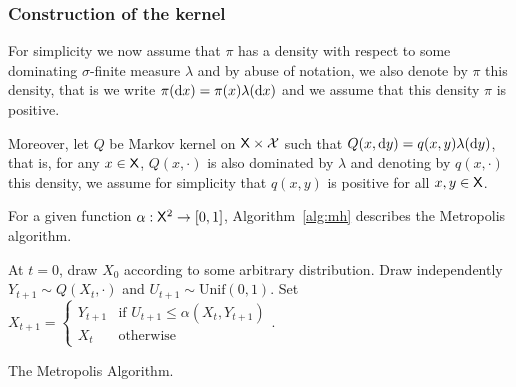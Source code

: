 \documentclass[english,graybox,envcountchap,envcountsame,sectrefs,shortlabels]{svmono}
\theoremstyle{style}
\begin{document}
\subsubsection{Construction of the kernel\label{subsec:construc}}

For simplicity we now assume that $\pi$ has a density with respect
to some dominating $\sigma$-finite measure $\lambda$ and by abuse
of notation, we also denote by $\pi$ this density, that is we write
$\pi(\mathrm{d} x)=\pi(x)\lambda(\mathrm{d} x)$ and we assume that this density
$\pi$ is positive.

Moreover, let $Q$ be Markov kernel on $\mathsf{X}\times\mathcal{X}$ such
that $Q(x,\mathrm{d} y)=q(x,y)\lambda(\mathrm{d} y)$, that is, for any $x\in\mathsf{X}$,
$Q(x,\cdot)$ is also dominated by $\lambda$ and denoting by $q(x,\cdot)$
this density, we assume for simplicity that $q(x,y)$ is positive
for all $x,y\in\mathsf{X}$. 

For a given function $\alpha:\mathsf{X}^{2}\to[0,1]$,  Algorithm~\ref{alg:mh} describes the Metropolis algorithm.

%

\begin{algorithm}
\centering
\begin{algorithmic}
\State At $t=0$, draw $X_{0}$ according to some arbitrary distribution.
\State Draw independently $Y_{t+1}\sim Q(X_{t},\cdot)$ and $U_{t+1}\sim\mathrm{Unif}(0,1)$.
\State Set $X_{t+1}=\begin{cases} Y_{t+1} & \mbox{if }U_{t+1}\leq\alpha(X_{t},Y_{t+1})\\ X_{t} & \mbox{otherwise} \end{cases}$. 
\EndFor
\end{algorithmic}
\caption{The Metropolis Algorithm.}
\label{alg:mh}
\end{algorithm}
\end{document}
